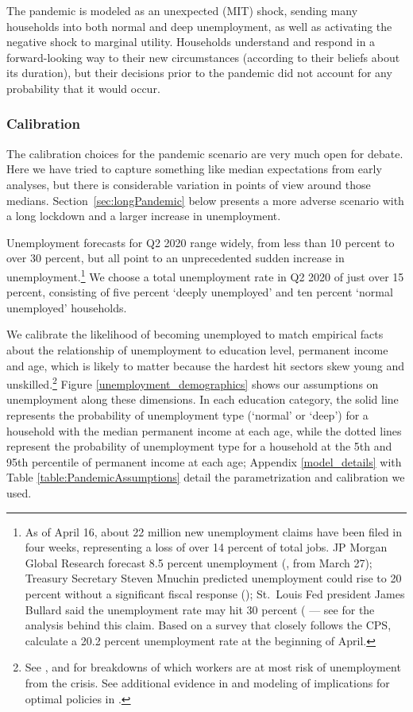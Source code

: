 \documentclass[titlepage]{\econtex}
\begin{document}
The pandemic is modeled as an unexpected (MIT) shock, sending many households into both normal and deep unemployment, as well as activating the negative shock to marginal utility. Households understand and respond in a forward-looking way to their new circumstances (according to their beliefs about its duration), but their decisions prior to the pandemic did not account for any probability that it would occur.

\subsubsection{Calibration}
The calibration choices for the pandemic scenario are very much open for debate. Here we have tried to capture something like median expectations from early analyses, but there is considerable variation in points of view around those medians. 
Section~\ref{sec:longPandemic} below presents a more adverse scenario with a long lockdown and a larger increase in unemployment.

Unemployment forecasts for Q2 2020 range widely, from less than 10 percent to over 30 percent, but all point to an unprecedented sudden increase in unemployment.\footnote{As of April 16, about 22 million new unemployment claims have been filed in four weeks, representing a loss of over 14 percent  of total jobs.  JP Morgan Global Research forecast 8.5 percent unemployment (\cite{JPMorganBlog2020}, from March 27); Treasury Secretary Steven Mnuchin predicted unemployment could rise to 20 percent without a significant fiscal response (\cite{Bloomberg1}); St.\ Louis Fed president James Bullard said the unemployment rate may hit 30 percent  (\cite{Bloomberg2} --- see \cite{FariaBlog2020} for the analysis behind this claim.  Based on a survey that closely follows the CPS, \cite{BickBlandin2020} calculate a 20.2 percent unemployment rate at the beginning of April.}
We choose a total unemployment rate in Q2 2020 of just over 15 percent, consisting of five percent `deeply unemployed' and ten percent `normal unemployed' households.

We calibrate the likelihood of becoming unemployed to match empirical facts about the relationship of unemployment to education level, permanent income and age, which is likely to matter because the hardest hit sectors skew young and unskilled.\footnote{See \cite{GasconCOVID2020}, \cite{LeiboviciSocial2020} and \cite{covid_USsurvey} for breakdowns of which workers are at most risk of unemployment from the crisis.
  See additional evidence in \cite{kmv_pandemics} and modeling of implications for optimal policies in \cite{healthWealth}.}
Figure \ref{unemployment_demographics} shows our assumptions on unemployment along these dimensions.
In each education category, the solid line represents the probability of unemployment type (`normal' or `deep') for a household with the median permanent income at each age, while the dotted lines represent the probability of unemployment type for a household at the 5th and 95th percentile of permanent income at each age; Appendix \ref{model_details} with Table \ref{table:PandemicAssumptions} detail the parametrization and calibration we used.
\end{document}
